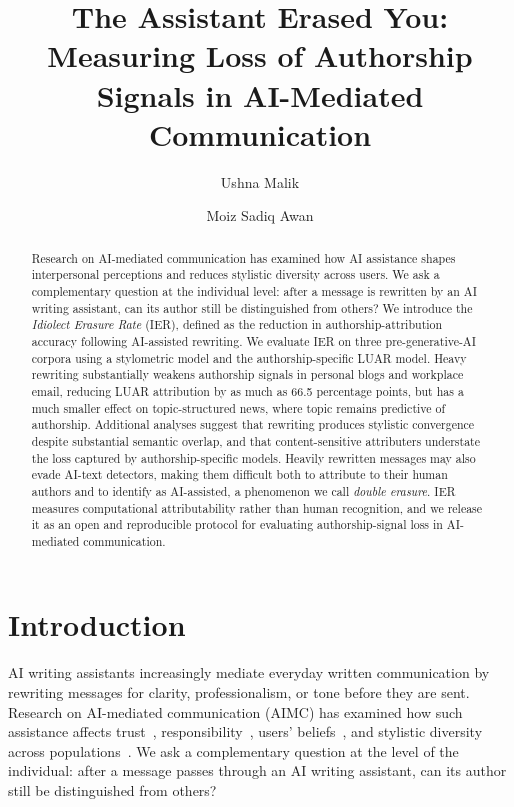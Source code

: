 \documentclass[sigconf,nonacm]{acmart}
\begin{document}
\title{The Assistant Erased You: Measuring Loss of Authorship Signals in
AI-Mediated Communication}

\author{Ushna Malik}
\author{Moiz Sadiq Awan}

\renewcommand{\shortauthors}{Malik and Awan}

\begin{abstract}
Research on AI-mediated communication has examined how AI assistance shapes
interpersonal perceptions and reduces stylistic diversity across users. We ask a
complementary question at the individual level: after a message is rewritten by an AI
writing assistant, can its author still be distinguished from others? We introduce
the \emph{Idiolect Erasure Rate} (IER), defined as the reduction in
authorship-attribution accuracy following AI-assisted rewriting. We evaluate IER on
three pre-generative-AI corpora using a stylometric model and the authorship-specific
LUAR model. Heavy rewriting substantially weakens authorship signals in personal
blogs and workplace email, reducing LUAR attribution by as much as 66.5 percentage
points, but has a much smaller effect on topic-structured news, where topic remains
predictive of authorship. Additional analyses suggest that rewriting produces
stylistic convergence despite substantial semantic overlap, and that
content-sensitive attributers understate the loss captured by authorship-specific
models. Heavily rewritten messages may also evade AI-text detectors, making them
difficult both to attribute to their human authors and to identify as AI-assisted, a
phenomenon we call \emph{double erasure}. IER measures computational attributability
rather than human recognition, and we release it as an open and reproducible protocol
for evaluating authorship-signal loss in AI-mediated communication.
\end{abstract}

\maketitle

\section{Introduction}

AI writing assistants increasingly mediate everyday written communication by
rewriting messages for clarity, professionalism, or tone before they are sent.
Research on AI-mediated communication (AIMC) has examined how such assistance affects
trust~\cite{jakesch2019,hohenstein2023}, responsibility~\cite{elish2019}, users'
beliefs~\cite{jakeschcowrite}, and stylistic diversity across
populations~\cite{padmakumar2024,agarwal2025}. We ask a complementary question at the
level of the individual: after a message passes through an AI writing assistant, can
its author still be distinguished from others?
\end{document}
